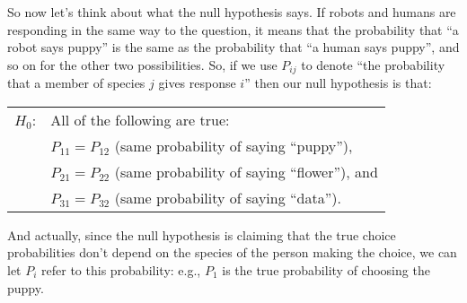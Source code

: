 So now let's think about what the null hypothesis says. If robots and humans are responding in the same way to the question, it means that the probability that ``a robot says puppy'' is the same as the probability that ``a human says puppy'', and so on for the other two possibilities. So, if we use $P_{ij}$ to denote ``the probability that a member of species $j$ gives response $i$'' then our null hypothesis is that:

\smallskip
\begin{tabular}{ll}
$H_0$: \hspace*{0.5cm} & All of the following are true: \\ 
    & $P_{11} = P_{12}$ (same probability of saying ``puppy''), \\ 
	& $P_{21} = P_{22}$ (same probability of saying ``flower''), and\\ 
	& $P_{31} = P_{32}$ (same probability of saying ``data'').\\ 
\end{tabular} 
\smallskip

\noindent
And actually, since the null hypothesis is claiming that the true choice probabilities don't depend on the species of the person making the choice, we can let $P_i$ refer to this probability: e.g., $P_1$ is the true probability of choosing the puppy.

